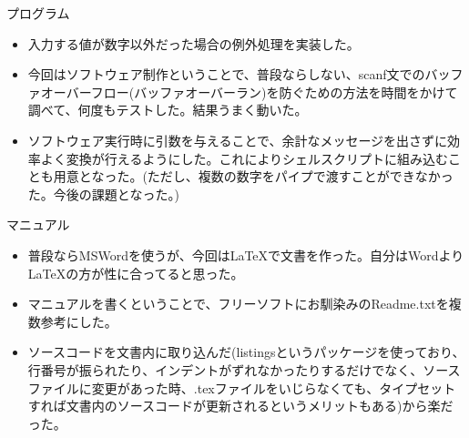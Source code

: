 \documentclass[10.5pt]{jsarticle}
\begin{document}
\begin{large}
\begin{enumerate}
プログラム
\begin{itemize}
\item 入力する値が数字以外だった場合の例外処理を実装した。
\item 今回はソフトウェア制作ということで、普段ならしない、scanf文でのバッファオーバーフロー(バッファオーバーラン)を防ぐための方法を時間をかけて調べて、何度もテストした。結果うまく動いた。
\item ソフトウェア実行時に引数を与えることで、余計なメッセージを出さずに効率よく変換が行えるようにした。これによりシェルスクリプトに組み込むことも用意となった。(ただし、複数の数字をパイプで渡すことができなかった。今後の課題となった。)\\
\end{itemize}
マニュアル
\begin{itemize}
\item 普段ならMSWordを使うが、今回はLaTeXで文書を作った。自分はWordよりLaTeXの方が性に合ってると思った。
\item マニュアルを書くということで、フリーソフトにお馴染みのReadme.txtを複数参考にした。
\item ソースコードを文書内に取り込んだ(listingsというパッケージを使っており、行番号が振られたり、インデントがずれなかったりするだけでなく、ソースファイルに変更があった時、.texファイルをいじらなくても、タイプセットすれば文書内のソースコードが更新されるというメリットもある)から楽だった。
\end{itemize}

\end{enumerate}
\end{large}
\end{document}
